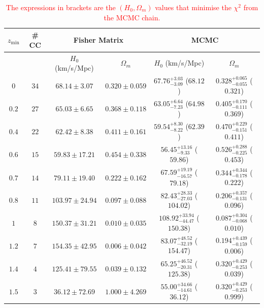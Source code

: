 \documentclass[aps,prl,10pt,twocolumn,superscriptaddress, nofootinbib]{revtex4}
\def\red{\textcolor{red}}
\begin{document}
\begin{table}[htb]
    \centering
    \begin{tabular}{c|c|c|c|c|c}
    \rule{0pt}{3ex} $z_{\textrm{min}}$ & \# CC & \multicolumn{2}{c}{Fisher Matrix}  & \multicolumn{2}{|c}{MCMC} \\
    \hline
    \rule{0pt}{3ex} & & $H_0$ (km/s/Mpc) & $\Omega_m$ & $H_0$ (km/s/Mpc) & $\Omega_m$ \\
    \hline
    \rule{0pt}{3ex} $0$ & $34$ & $68.14 \pm 3.07$ & $0.320 \pm 0.059$ & $67.76^{+3.03}_{-3.09}$  ($68.12$) & $0.328^{+0.065}_{-0.055}$ ($0.321$) \\
    \hline 
    \rule{0pt}{3ex} $0.2$ & $27$ & $65.03 \pm 6.65$ & $0.368 \pm 0.118$ & $63.05^{+6.64}_{-7.23}$ ($64.98$) & $0.405^{+0.170}_{-0.111}$ ($0.369$) \\
    \hline 
    \rule{0pt}{3ex} $0.4$ & $22$ & $62.42 \pm 8.38$ & $0.411 \pm 0.161$ & $59.54^{+8.30}_{-8.22}$ ($62.39$) & $0.470^{+0.229}_{-0.151}$ ($0.411$)\\
    \hline 
    \rule{0pt}{3ex} $0.6$ & $15$ & $59.83 \pm 17.21$ & $0.454 \pm 0.338$ & $56.45^{+13.16}_{-9.33}$ ($59.86$) & $0.526^{+0.288}_{-0.225}$ ($0.453$) \\
    \hline 
    \rule{0pt}{3ex} $0.7$ & $14$ & $79.11 \pm 19.40$ & $0.222 \pm 0.162$ & $67.59^{+19.19}_{-16.57}$ ($79.18$) & $0.344^{+0.344}_{-0.178}$ ($0.222$) \\
    \hline 
    \rule{0pt}{3ex} $0.8$ & $11$ & $103.97 \pm 24.94$ & $0.097 \pm 0.088$ & $82.43^{+28.33}_{-27.03}$ ($104.02$) & $0.206^{+0.357}_{-0.131}$ ($0.096$) \\
    \hline 
    \rule{0pt}{3ex} $1$ & $8$ & $150.37 \pm 31.21$ & $0.010 \pm 0.035$ & $108.92^{+33.94}_{-44.47}$ ($150.38$) & $0.087^{+0.304}_{-0.068}$ ($0.010$) \\
    \hline 
    \rule{0pt}{3ex} $1.2$ & $7$ & $154.35 \pm 42.95$ & $0.006 \pm 0.042$ & $83.07^{+48.52}_{-32.19}$ ($154.47$) & $0.194^{+0.439}_{-0.159}$ ($0.006$) \\
    \hline 
    \rule{0pt}{3ex} $1.4$ & $4$ & $125.41 \pm 79.55$ & $0.039 \pm 0.132$ & $65.25^{+46.52}_{-20.31}$ ($125.38$) & $0.320^{+0.429}_{-0.253}$ ($0.039$) \\
    \hline 
    \rule{0pt}{3ex} $1.5$ & $3$ & $36.12 \pm 72.69$ & $1.000 \pm 4.269$ & $55.00^{+34.66}_{-14.61}$ ($36.12$) & $0.320^{+0.429}_{-0.253}$ ($0.999$)
    \end{tabular}
    \caption{\red{The expressions in brackets are the $(H_0, \Omega_m)$ values that minimise the $\chi^2$ from the MCMC chain.}}
    \label{tab:LCDM_CC}
\end{table}
\end{document}
